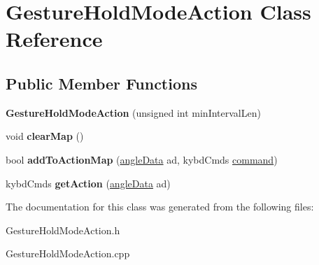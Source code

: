 \hypertarget{class_gesture_hold_mode_action}{\section{Gesture\+Hold\+Mode\+Action Class Reference}
\label{class_gesture_hold_mode_action}
}
\subsection*{Public Member Functions}
\begin{DoxyCompactItemize}
\item 
\hypertarget{class_gesture_hold_mode_action_aaf5a4037ba4e75fcd62598444ba4fb5e}{{\bfseries Gesture\+Hold\+Mode\+Action} (unsigned int min\+Interval\+Len)}\label{class_gesture_hold_mode_action_aaf5a4037ba4e75fcd62598444ba4fb5e}

\item 
\hypertarget{class_gesture_hold_mode_action_ae69e9d3ea0730c541b55a35addb79aee}{void {\bfseries clear\+Map} ()}\label{class_gesture_hold_mode_action_ae69e9d3ea0730c541b55a35addb79aee}

\item 
\hypertarget{class_gesture_hold_mode_action_a65594540731af2676f2789bd90ffaa31}{bool {\bfseries add\+To\+Action\+Map} (\hyperlink{structangle_data}{angle\+Data} ad, kybd\+Cmds \hyperlink{structcommand}{command})}\label{class_gesture_hold_mode_action_a65594540731af2676f2789bd90ffaa31}

\item 
\hypertarget{class_gesture_hold_mode_action_aa4294b9e71260e93e8f1e37002254a24}{kybd\+Cmds {\bfseries get\+Action} (\hyperlink{structangle_data}{angle\+Data} ad)}\label{class_gesture_hold_mode_action_aa4294b9e71260e93e8f1e37002254a24}

\end{DoxyCompactItemize}


The documentation for this class was generated from the following files\+:\begin{DoxyCompactItemize}
\item 
Gesture\+Hold\+Mode\+Action.\+h\item 
Gesture\+Hold\+Mode\+Action.\+cpp\end{DoxyCompactItemize}
